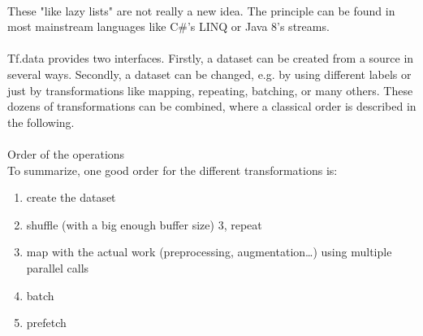 \\
These "like lazy lists" are not really a new idea. The principle can be found in most mainstream languages like C#'s LINQ or Java 8's streams.  \\
\\
Tf.data provides two interfaces. Firstly, a dataset can be created from a source in several ways. Secondly, a dataset can be changed, e.g. by using different labels or just by transformations like mapping, repeating, batching, or many others. These dozens of transformations can be combined, where a classical order is described in the following. \\
\\
Order of the operations \\
To summarize, one good order for the different transformations is:
\begin{enumerate}
\item create the dataset
\item shuffle (with a big enough buffer size) 3, repeat
\item map with the actual work (preprocessing, augmentation…) using multiple parallel calls
\item batch
\item prefetch
\end{enumerate}
\\

